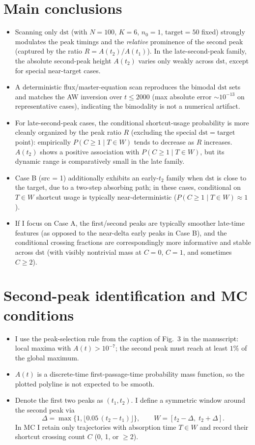 \documentclass[11pt]{article}
\begin{document}
\section{Main conclusions}
\begin{itemize}
  \item Scanning only $\mathrm{dst}$ (with $N=100$, $K=6$, $n_0=1$, $\mathrm{target}=50$ fixed) strongly modulates the peak timings and the \emph{relative} prominence of the second peak (captured by the ratio $R=A(t_2)/A(t_1)$). In the late-second-peak family, the absolute second-peak height $A(t_2)$ varies only weakly across $\mathrm{dst}$, except for special near-target cases.
  \item A deterministic flux/master-equation scan reproduces the bimodal $\mathrm{dst}$ sets and matches the AW inversion over $t\le 2000$ (max absolute error $\sim 10^{-13}$ on representative cases), indicating the bimodality is not a numerical artifact.
  \item For late-second-peak cases, the conditional shortcut-usage probability is more cleanly organized by the peak ratio $R$ (excluding the special $\mathrm{dst}=\mathrm{target}$ point): empirically $P(C\ge1\mid T\in W)$ tends to decrease as $R$ increases. $A(t_2)$ shows a positive association with $P(C\ge1\mid T\in W)$, but its dynamic range is comparatively small in the late family.
  \item Case B (src = 1) additionally exhibits an early-$t_2$ family when $\mathrm{dst}$ is close to the target, due to a two-step absorbing path; in these cases, conditional on $T\in W$ shortcut usage is typically near-deterministic ($P(C\ge1\mid T\in W)\approx 1$).
  \item If I focus on Case A, the first/second peaks are typically smoother late-time features (as opposed to the near-delta early peaks in Case B), and the conditional crossing fractions are correspondingly more informative and stable across $\mathrm{dst}$ (with visibly nontrivial mass at $C=0$, $C=1$, and sometimes $C\ge2$).
\end{itemize}

\section{Second-peak identification and MC conditions}
\begin{itemize}
  \item I use the peak-selection rule from the caption of Fig.~3 in the manuscript: local maxima with $A(t)>10^{-7}$; the second peak must reach at least $1\%$ of the global maximum.
  \item $A(t)$ is a discrete-time first-passage-time probability mass function, so the plotted polyline is not expected to be smooth.
  \item Denote the first two peaks as $(t_1,t_2)$. I define a symmetric window around the second peak via
  \[
    \Delta=\max\{1,\lfloor 0.05\,(t_2-t_1)\rfloor\},\qquad W=[t_2-\Delta,\;t_2+\Delta].
  \]
  In MC I retain only trajectories with absorption time $T\in W$ and record their shortcut crossing count $C$ (0, 1, or $\ge 2$).
\end{itemize}
\end{document}
